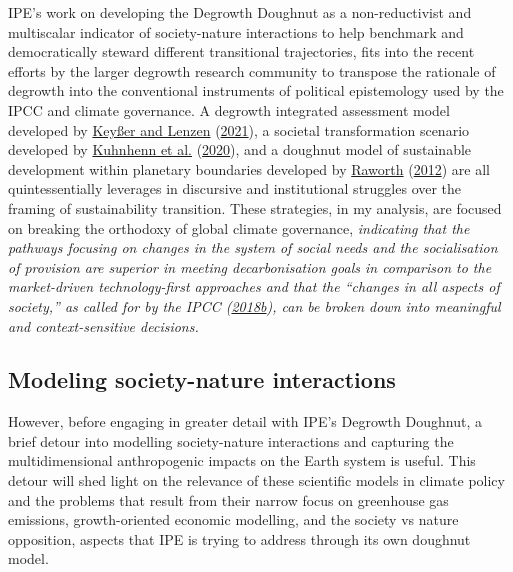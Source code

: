 \documentclass[a4paper, nobind]{templates/ociamthesis}
\begin{document}
IPE's work on developing the Degrowth Doughnut as a non-reductivist and multiscalar indicator of society-nature interactions to help benchmark and democratically steward different transitional trajectories, fits into the recent efforts by the larger degrowth research community to transpose the rationale of degrowth into the conventional instruments of political epistemology used by the IPCC and climate governance. A degrowth integrated assessment model developed by \protect\hyperlink{ref-keysser_15_2021}{Keyßer and Lenzen} (\protect\hyperlink{ref-keysser_15_2021}{2021}), a societal transformation scenario developed by \protect\hyperlink{ref-kuhnhenn_societal_2020}{Kuhnhenn et al.} (\protect\hyperlink{ref-kuhnhenn_societal_2020}{2020}), and a doughnut model of sustainable development within planetary boundaries developed by \protect\hyperlink{ref-raworth_safe_2012}{Raworth} (\protect\hyperlink{ref-raworth_safe_2012}{2012}) are all quintessentially leverages in discursive and institutional struggles over the framing of sustainability transition. These strategies, in my analysis, are focused on breaking the orthodoxy of global climate governance, \emph{indicating that the pathways focusing on changes in the system of social needs and the socialisation of provision are superior in meeting decarbonisation goals in comparison to the market-driven technology-first approaches and that the ``changes in all aspects of society,'' as called for by the IPCC (\protect\hyperlink{ref-ipcc_summary_2018}{2018b}), can be broken down into meaningful and context-sensitive decisions.}

\hypertarget{modeling-society-nature-interactions}{%
\subsection{Modeling society-nature interactions}\label{modeling-society-nature-interactions}}

However, before engaging in greater detail with IPE's Degrowth Doughnut, a brief detour into modelling society-nature interactions and capturing the multidimensional anthropogenic impacts on the Earth system is useful. This detour will shed light on the relevance of these scientific models in climate policy and the problems that result from their narrow focus on greenhouse gas emissions, growth-oriented economic modelling, and the society vs nature opposition, aspects that IPE is trying to address through its own doughnut model.
\end{document}

